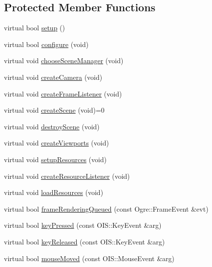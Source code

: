 \subsection*{Protected Member Functions}
\begin{DoxyCompactItemize}
\item 
virtual bool \hyperlink{class_base_application_ae548b5e3ac0cf92d4dc7d478a8f01922}{setup} ()
\item 
virtual bool \hyperlink{class_base_application_a7882a8f2e08e8d6cde00e8c29b2153b0}{configure} (void)
\item 
virtual void \hyperlink{class_base_application_a0cf5e311b1c7426590ad6831e4c5352a}{choose\-Scene\-Manager} (void)
\item 
virtual void \hyperlink{class_base_application_ad1285286a30e44011746fe80f3bc1aa0}{create\-Camera} (void)
\item 
virtual void \hyperlink{class_base_application_ab672d2b969b8530ee753f8b000d219c6}{create\-Frame\-Listener} (void)
\item 
virtual void \hyperlink{class_base_application_aa97beeb4059b17d0ec22eae33286ec2d}{create\-Scene} (void)=0
\item 
virtual void \hyperlink{class_base_application_ab61c91a38b99f98ff369ce8098a91133}{destroy\-Scene} (void)
\item 
virtual void \hyperlink{class_base_application_a8e35ac97bd0cf7a3f90b280c8826389c}{create\-Viewports} (void)
\item 
virtual void \hyperlink{class_base_application_aa71428aeca821504352f5f795e6a9226}{setup\-Resources} (void)
\item 
virtual void \hyperlink{class_base_application_a9e916d51e4d73e355091d0662c175d85}{create\-Resource\-Listener} (void)
\item 
virtual void \hyperlink{class_base_application_a7d72de4f9e3d17ce0a4a034d780baf67}{load\-Resources} (void)
\item 
virtual bool \hyperlink{class_base_application_adea8d433b93b66ec7ab48b7e244661df}{frame\-Rendering\-Queued} (const Ogre\-::\-Frame\-Event \&evt)
\item 
virtual bool \hyperlink{class_base_application_ad79efa8c9d6f0f6a3cf8a34c25a1bd5f}{key\-Pressed} (const O\-I\-S\-::\-Key\-Event \&arg)
\item 
virtual bool \hyperlink{class_base_application_a72dbb7e590af8f96904bc55eb1875a56}{key\-Released} (const O\-I\-S\-::\-Key\-Event \&arg)
\item 
virtual bool \hyperlink{class_base_application_abbb67365fb496300701dc7a6953936fe}{mouse\-Moved} (const O\-I\-S\-::\-Mouse\-Event \&arg)

\end{DoxyCompactItemize}
